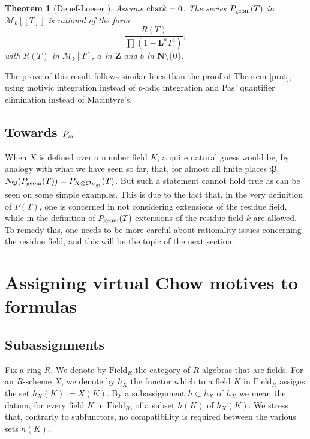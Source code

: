 \documentclass[english,12pt]{amsart}
\let\got\mathfrak
\def\gP{{\got P}}
\def\LL{{\mathbf L}}
\def\NN{{\mathbf N}}
\def\ZZ{{\mathbf Z}}
\def\cM{{\mathcal M}}
\def\cO{{\mathcal O}}
\newtheorem{theorem}[subsubsection]{Theorem}
\theoremstyle{definition}
\theoremstyle{remark}
\theoremstyle{plain}
\numberwithin{equation}{subsection}
\let\got\mathfrak
\def\LL{{\mathbf L}}
\def\NN{{\mathbf N}}
\def\ZZ{{\mathbf Z}}
\def\cM{{\mathcal M}}
\def\cO{{\mathcal O}}
\begin{document}
\begin{theorem}[Denef-Loeser \cite{inv}]\label{Pg}
Assume ${\rm char} k = 0$.
The series 
$P_{\rm geom} (T)$
in $\cM_k [[T]]$ is rational of the form
$$
\frac{R (T)}{\prod (1 - \LL^a T^b)},
$$
with $R (T)$ in 
$\cM_k [T]$, $a$ in $\ZZ$ and $b$ in $\NN \setminus \{0\}$.
\end{theorem}

The prove of this result follows similar lines than the proof of Theorem \ref{prat},
using motivic integration instead
of $p$-adic integration and Pas' quantifier elimination instead of Macintyre's.




\subsection{Towards $P_{\rm ar}$}When $X$ is defined over a number field
$K$, 
a quite natural guess would be, by
analogy with what we have seen
so far, that,
for almost
all finite places $\gP$,
$N_{\gP} (P_{\rm geom} (T)) = P_{X \otimes \cO_{K_{\gP}}} (T)$.
But such a statement cannot hold true as can be seen on some simple examples.
This is due to the fact that,
in the very definition of $P (T)$, one is concerned in not considering
extensions of the residue field, while in the definition
of $P_{\rm geom} (T)$ extensions of the residue field $k$
are allowed.
To remedy this, one needs to be more careful about
rationality issues concerning the residue field, and this will be the topic of the  next section.





\section{Assigning virtual Chow motives to formulas}


\subsection{Subassignments}
Fix a ring $R$. We denote
by $\textrm{Field}_R$
the category of $R$-algebras that are fields.
For an $R$-scheme $X$, we denote by $h_X$ the functor
which to a field $K$ in 
$\textrm{Field}_R$ assigns the set
$h_X (K) := X (K)$.
By a subassignment $h \subset h_X$
of 
$h_X$
we mean the datum, for every 
field $K$ in 
$\textrm{Field}_R$, of a subset $h (K)$ of 
$h_X (K)$. We stress that, contrarly to subfunctors,
no compatibility is required
between the various sets
$h (K)$.
\end{document}
